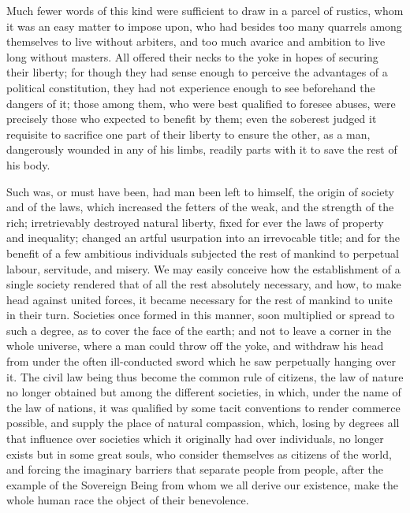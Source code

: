 \documentclass[11pt,twocolumn]{ltugboat}
\begin{document}
Much fewer words of this kind were sufficient to draw in a parcel of
rustics, whom it was an easy matter to impose upon, who had besides
too many quarrels among themselves to live without arbiters, and too
much avarice and ambition to live long without masters. All offered
their necks to the yoke in hopes of securing their liberty; for though
they had sense enough to perceive the advantages of a political
constitution, they had not experience enough to see beforehand the
dangers of it; those among them, who were best qualified to foresee
abuses, were precisely those who expected to benefit by them; even the
soberest judged it requisite to sacrifice one part of their liberty to
ensure the other, as a man, dangerously wounded in any of his limbs,
readily parts with it to save the rest of his body.

Such was, or must have been, had man been left to himself, the origin
of society and of the laws, which increased the fetters of the weak,
and the strength of the rich; irretrievably destroyed natural liberty,
fixed for ever the laws of property and inequality; changed an artful
usurpation into an irrevocable title; and for the benefit of a few
ambitious individuals subjected the rest of mankind to perpetual
labour, servitude, and misery. We may easily conceive how the
establishment of a single society rendered that of all the rest
absolutely necessary, and how, to make head against united forces, it
became necessary for the rest of mankind to unite in their turn.
Societies once formed in this manner, soon multiplied or spread to
such a degree, as to cover the face of the earth; and not to leave a
corner in the whole universe, where a man could throw off the yoke,
and withdraw his head from under the often ill-conducted sword which
he saw perpetually hanging over it. The civil law being thus become
the common rule of citizens, the law of nature no longer obtained but
among the different societies, in which, under the name of the law of
nations, it was qualified by some tacit conventions to render commerce
possible, and supply the place of natural compassion, which, losing by
degrees all that influence over societies which it originally had over
individuals, no longer exists but in some great souls, who consider
themselves as citizens of the world, and forcing the imaginary
barriers that separate people from people, after the example of the
Sovereign Being from whom we all derive our existence, make the whole
human race the object of their benevolence.
\end{document}
